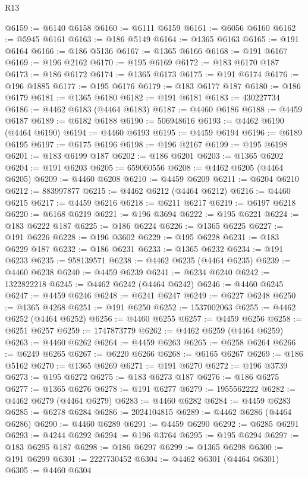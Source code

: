 \begin{lexlean}{R13}
\begin{coremodule}
@6159 := @6140 @6158
@6160 := @6111 @6159
@6161 := @6056 @6160
@6162 := @5945 @6161
@6163 := @186 @5149
@6164 := @1365 @6163
@6165 := @191 @6164
@6166 := @186 @5136
@6167 := @1365 @6166
@6168 := @191 @6167
@6169 := @196 @2162
@6170 := @195 @6169
@6172 := @183 @6170 @187
@6173 := @186 @6172
@6174 := @1365 @6173
@6175 := @191 @6174
@6176 := @196 @1885
@6177 := @195 @6176
@6179 := @183 @6177 @187
@6180 := @186 @6179
@6181 := @1365 @6180
@6182 := @191 @6181
@6183 := 430227734
@6186 := @4462 @6183 (@4464 @6183)
@6187 := @4460 @6186
@6188 := @4459 @6187
@6189 := @6182 @6188
@6190 := 506948616
@6193 := @4462 @6190 (@4464 @6190)
@6194 := @4460 @6193
@6195 := @4459 @6194
@6196 := @6189 @6195
@6197 := @6175 @6196
@6198 := @196 @2167
@6199 := @195 @6198
@6201 := @183 @6199 @187
@6202 := @186 @6201
@6203 := @1365 @6202
@6204 := @191 @6203
@6205 := 659060556
@6208 := @4462 @6205 (@4464 @6205)
@6209 := @4460 @6208
@6210 := @4459 @6209
@6211 := @6204 @6210
@6212 := 883997877
@6215 := @4462 @6212 (@4464 @6212)
@6216 := @4460 @6215
@6217 := @4459 @6216
@6218 := @6211 @6217
@6219 := @6197 @6218
@6220 := @6168 @6219
@6221 := @196 @3694
@6222 := @195 @6221
@6224 := @183 @6222 @187
@6225 := @186 @6224
@6226 := @1365 @6225
@6227 := @191 @6226
@6228 := @196 @3602
@6229 := @195 @6228
@6231 := @183 @6229 @187
@6232 := @186 @6231
@6233 := @1365 @6232
@6234 := @191 @6233
@6235 := 958139571
@6238 := @4462 @6235 (@4464 @6235)
@6239 := @4460 @6238
@6240 := @4459 @6239
@6241 := @6234 @6240
@6242 := 1322822218
@6245 := @4462 @6242 (@4464 @6242)
@6246 := @4460 @6245
@6247 := @4459 @6246
@6248 := @6241 @6247
@6249 := @6227 @6248
@6250 := @1365 @4268
@6251 := @191 @6250
@6252 := 1537002063
@6255 := @4462 @6252 (@4464 @6252)
@6256 := @4460 @6255
@6257 := @4459 @6256
@6258 := @6251 @6257
@6259 := 1747873779
@6262 := @4462 @6259 (@4464 @6259)
@6263 := @4460 @6262
@6264 := @4459 @6263
@6265 := @6258 @6264
@6266 := @6249 @6265
@6267 := @6220 @6266
@6268 := @6165 @6267
@6269 := @186 @5162
@6270 := @1365 @6269
@6271 := @191 @6270
@6272 := @196 @3739
@6273 := @195 @6272
@6275 := @183 @6273 @187
@6276 := @186 @6275
@6277 := @1365 @6276
@6278 := @191 @6277
@6279 := 1955562222
@6282 := @4462 @6279 (@4464 @6279)
@6283 := @4460 @6282
@6284 := @4459 @6283
@6285 := @6278 @6284
@6286 := 2024104815
@6289 := @4462 @6286 (@4464 @6286)
@6290 := @4460 @6289
@6291 := @4459 @6290
@6292 := @6285 @6291
@6293 := @4244 @6292
@6294 := @196 @3764
@6295 := @195 @6294
@6297 := @183 @6295 @187
@6298 := @186 @6297
@6299 := @1365 @6298
@6300 := @191 @6299
@6301 := 2227730452
@6304 := @4462 @6301 (@4464 @6301)
@6305 := @4460 @6304

\end{coremodule}
\end{lexlean}

